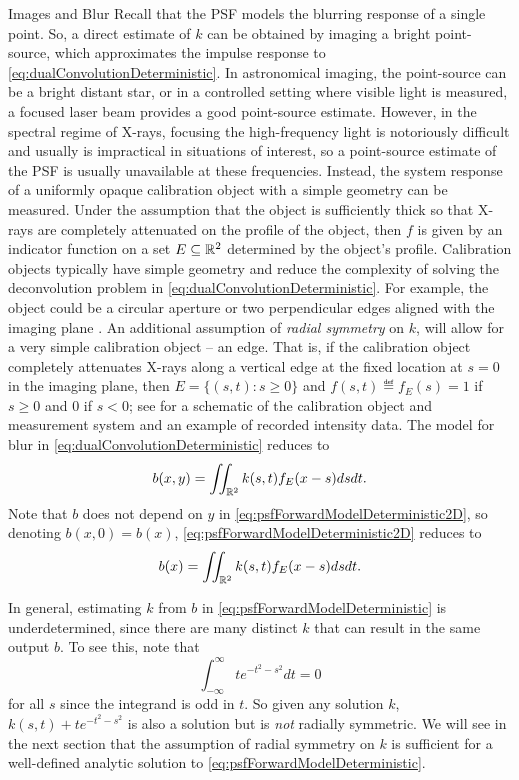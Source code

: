 \begin{chapter}{Images and Blur}
  Recall that the PSF models the blurring response of a single point.
  So, a direct estimate of $k$ can be obtained by imaging a bright point-source, which approximates the impulse response to \eqref{eq:dualConvolutionDeterministic}.
  In astronomical imaging, the point-source can be a bright distant star, or in a controlled setting where visible light is measured, a focused laser beam provides a good point-source estimate.
  However, in the spectral regime of X-rays, focusing the high-frequency light is notoriously difficult and usually is impractical in situations of interest, so a point-source estimate of the PSF is usually unavailable at these frequencies.
  Instead, the system response of a uniformly opaque calibration object with a simple geometry can be measured.
  Under the assumption that the object is sufficiently thick so that X-rays are completely attenuated on the profile of the object, then $f$ is given by an indicator function on a set $E \subseteq \mathbb R^2$ determined by the object's profile.
  Calibration objects typically have simple geometry and reduce the complexity of solving the deconvolution problem in \eqref{eq:dualConvolutionDeterministic}.  
  For example, the object could be a circular aperture or two perpendicular edges aligned with the imaging plane \citep{doering1992,watson1993}.
  An additional assumption of \emph{radial symmetry} on $k$, will allow for a very simple calibration object -- an edge. 
  That is, if the calibration object completely attenuates X-rays along a vertical edge at the fixed location at $s=0$ in the imaging plane, then $E=\{(s,t):s\ge0\}$ and $f(s,t) \eqdef f_E(s) = 1$ if $s\ge0$ and $0$ if $s <0$; see  for a schematic of the calibration object and measurement system and an example of recorded intensity data.
  The model for blur in \eqref{eq:dualConvolutionDeterministic} reduces to
\begin{equation}\label{eq:psfForwardModelDeterministic2D}
  b(x,y) = \iint_{\mathbb R^2} k(s,t) f_E(x-s)dsdt. 
\end{equation}
  Note that $b$ does not depend on $y$ in \eqref{eq:psfForwardModelDeterministic2D}, so denoting $b(x,0) = b(x)$, \eqref{eq:psfForwardModelDeterministic2D} reduces to
\begin{equation}\label{eq:psfForwardModelDeterministic}
  b(x) = \iint_{\mathbb R^2} k(s,t) f_E(x-s)dsdt. 
\end{equation} 
  
  In general, estimating $k$ from $b$ in \eqref{eq:psfForwardModelDeterministic} is underdetermined, since there are many distinct $k$ that can result in the same output $b$.
  To see this, note that 
  \begin{equation}
    \int_{-\infty}^{\infty} te^{-t^2 - s^2}dt = 0
  \end{equation}
  for all $s$ since the integrand is odd in $t$.
  So given any solution $k$, $k(s,t)+te^{-t^2 - s^2}$ is also a solution but is \emph{not} radially symmetric.
  We will see in the next section that the assumption of radial symmetry on $k$ is sufficient for a well-defined analytic solution to \eqref{eq:psfForwardModelDeterministic}.


\end{chapter}
